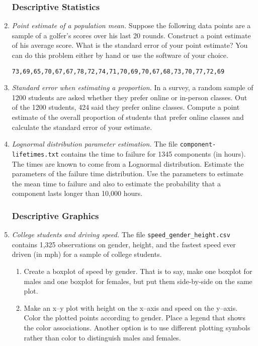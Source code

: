\begin{enumerate}
\subsubsection*{Descriptive Statistics}

\item \emph{Point estimate of a population mean.} Suppose the
  following data points are a sample of a golfer's scores over his
  last 20 rounds.  Construct a point estimate of his average
  score. What is the standard error of your point estimate? You can do
  this problem either by hand or use the software of your choice.
\begin{verbatim}
73,69,65,70,67,67,78,72,74,71,70,69,70,67,68,73,70,77,72,69
\end{verbatim}
  
\item \emph{Standard error when estimating a proportion.} In a survey, a
  random sample of \num{1200} students are asked whether they prefer
  online or in-person classes.  Out of the \num{1200} students,
  \num{424} said they prefer online classes. Compute a point estimate
  of the overall proportion of students that prefer online classes and
  calculate the standard error of your estimate.

\item \emph{Lognormal distribution parameter estimation.}  The file
  \texttt{component-lifetimes.txt} contains the time to failure for
  \num{1345} components (in hours). The times are known to come from a
  Lognormal distribution. Estimate the parameters of the failure time
  distribution. Use the parameters to estimate the mean time to
  failure and also to estimate the probability that a component lasts
  longer than 10,000 hours.


\subsubsection*{Descriptive Graphics}

\item \emph{College students and driving speed.} The file
  \texttt{speed\_gender\_height.csv} contains 1,325 observations on
  gender, height, and the fastest speed ever driven (in mph) for a
  sample of college students.

\begin{enumerate}
\item Create a boxplot of speed by gender. That is to say, make one
  boxplot for males and one boxplot for females, but put them
  side-by-side on the same plot.
\item Make an x--y plot with height on the x--axis and speed on the
  y--axis. Color the plotted points according to gender. Place a
  legend that shows the color associations. Another option is to use
  different plotting symbols rather than color to distinguish males
  and females.
\end{enumerate}

\end{enumerate}
